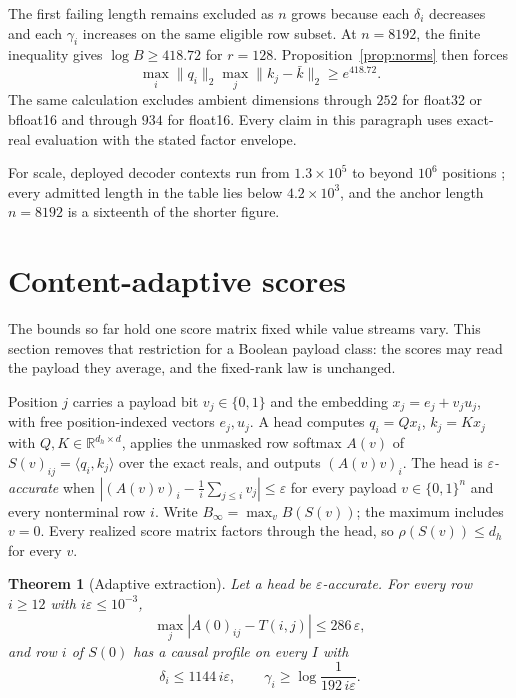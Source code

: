 \documentclass[10pt]{article}
\newtheorem{theorem}{Theorem}
\theoremstyle{definition}
\newcommand{\R}{\mathbb R}
\begin{document}
The first failing length remains excluded as \(n\) grows because each
\(\delta_i\) decreases and each \(\gamma_i\) increases on the same eligible
row subset.  At \(n=8192\), the finite inequality gives \(\log B\ge418.72\)
for \(r=128\).  Proposition~\ref{prop:norms} then forces
\[
 \max_i\|q_i\|_2\max_j\|k_j-\bar k\|_2\ge e^{418.72}.
\]
The same calculation excludes ambient dimensions through \(252\) for
float32 or bfloat16 and through \(934\) for float16.  Every claim in this
paragraph uses exact-real evaluation with the stated factor envelope.

For scale, deployed decoder contexts run from \(1.3\times10^{5}\) to beyond
\(10^{6}\) positions \cite{llama3herd,gemini15}; every admitted length in
the table lies below \(4.2\times10^{3}\), and the anchor length \(n=8192\)
is a sixteenth of the shorter figure.

\section{Content-adaptive scores}\label{sec:adaptive}

The bounds so far hold one score matrix fixed while value streams vary.
This section removes that restriction for a Boolean payload class: the
scores may read the payload they average, and the fixed-rank law is
unchanged.

Position \(j\) carries a payload bit \(v_j\in\{0,1\}\) and the embedding
\(x_j=e_j+v_ju_j\), with free position-indexed vectors \(e_j,u_j\).  A head
computes \(q_i=Qx_i\), \(k_j=Kx_j\) with \(Q,K\in\R^{d_h\times d}\), applies
the unmasked row softmax \(A(v)\) of \(S(v)_{ij}=\langle q_i,k_j\rangle\)
over the exact reals, and outputs \((A(v)v)_i\).  The head is
\emph{\(\varepsilon\)-accurate} when
\(|(A(v)v)_i-\frac1i\sum_{j\le i}v_j|\le\varepsilon\) for every payload
\(v\in\{0,1\}^n\) and every nonterminal row \(i\).  Write
\(B_\infty=\max_v B(S(v))\); the maximum includes \(v=0\).  Every realized
score matrix factors through the head, so \(\rho(S(v))\le d_h\) for every
\(v\).

\begin{theorem}[Adaptive extraction]\label{thm:adaptive}
Let a head be \(\varepsilon\)-accurate.  For every row \(i\ge12\) with
\(i\varepsilon\le10^{-3}\),
\[
 \max_j|A(0)_{ij}-T(i,j)|\le286\,\varepsilon,
\]
and row \(i\) of \(S(0)\) has a causal profile on every \(I\) with
\[
 \delta_i\le1144\,i\varepsilon,
 \qquad
 \gamma_i\ge\log\frac1{192\,i\varepsilon}.
\]
\end{theorem}
\end{document}
